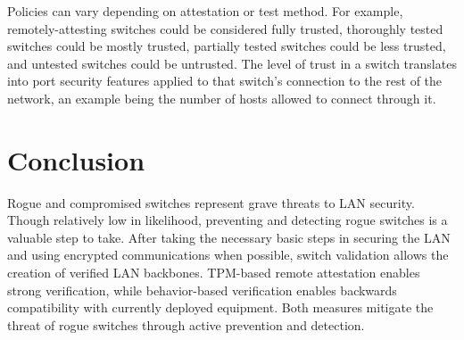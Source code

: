 \documentclass[journal]{IEEEtran}
\begin{document}
Policies can vary depending on attestation or test method. For example, remotely-attesting switches
could be considered fully trusted, thoroughly tested switches could be mostly trusted, partially
tested switches could be less trusted, and untested switches could be untrusted. The level of trust
in a switch translates into port security features applied to that switch's connection to the rest
of the network, an example being the number of hosts allowed to connect through it.



\section{Conclusion}
Rogue and compromised switches represent grave threats to LAN security. Though relatively low in
likelihood, preventing and detecting rogue switches is a valuable step to take. After taking the
necessary basic steps in securing the LAN and using encrypted communications when possible,
switch validation allows the creation of verified LAN backbones. TPM-based remote attestation
enables strong verification, while behavior-based verification enables backwards compatibility with
currently deployed equipment. Both measures mitigate the threat of rogue switches through active
prevention and detection.




\end{document}
